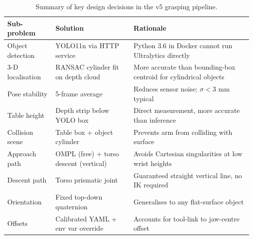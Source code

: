 \begin{table}[H]
\centering
\caption{Summary of key design decisions in the v5 grasping pipeline.}
\label{tab:grasp_summary}
\begin{tabularx}{\linewidth}{lXX}
\toprule
\textbf{Sub-problem} & \textbf{Solution} & \textbf{Rationale} \\
\midrule
Object detection & YOLO11n via HTTP service & Python 3.6 in Docker cannot run Ultralytics directly \\
3-D localisation & RANSAC cylinder fit on depth cloud & More accurate than bounding-box centroid for cylindrical objects \\
Pose stability   & 5-frame average & Reduces sensor noise; $\sigma < 3$ mm typical \\
Table height     & Depth strip below YOLO box & Direct measurement, more accurate than inference \\
Collision scene  & Table box + object cylinder & Prevents arm from colliding with surface \\
Approach path    & OMPL (free) + torso descent (vertical) & Avoids Cartesian singularities at low wrist heights \\
Descent path     & Torso prismatic joint & Guaranteed straight vertical line, no IK required \\
Orientation      & Fixed top-down quaternion & Generalises to any flat-surface object \\
Offsets          & Calibrated YAML + env var override & Accounts for tool-link to jaw-centre offset \\
\bottomrule
\end{tabularx}
\end{table}
